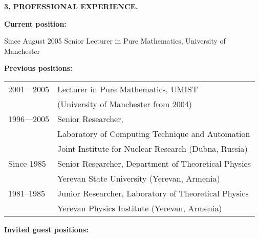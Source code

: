 \documentclass[12pt]{article}
\newcommand{\punkt}{\par\medskip\noindent}
\newcommand{\razdel}{\par\bigskip\noindent}
\begin{document}
   \newpage
   \razdel
   \begin{center}
   \large \bf 3. PROFESSIONAL EXPERIENCE.
   \end{center}
 \punkt
 {\bf Current position:}

\smallskip\noindent
Since August 2005 Senior Lecturer in Pure Mathematics, University of
Manchester\\



\punkt
 {\bf Previous positions:}



 \smallskip\noindent
 \begin{tabular}{ll}

 2001---2005
        &  Lecturer in Pure Mathematics, UMIST\\
         &  (University of Manchester from 2004)\\


1996---2005
&Senior Researcher,\\
 &Laboratory of Computing Technique and Automation\\
 &Joint Institute for Nuclear Research (Dubna, Russia)\\


\smallskip\noindent
              Since 1985
          & Senior Researcher,
         Department of Theoretical  Physics \\
        & Yerevan State University (Yerevan, Armenia)\\




   1981--1985    &     Junior Researcher,
              Laboratory of Theoretical Physics\\
         &          Yerevan Physics Institute (Yerevan, Armenia)\\
 \end{tabular}

\punkt
 {\bf Invited guest  positions:}
\end{document}
